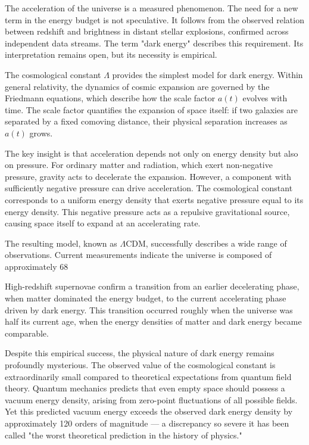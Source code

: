 The acceleration of the universe is a measured phenomenon. The need for a new term in the energy budget is not speculative. It follows from the observed relation between redshift and brightness in distant stellar explosions, confirmed across independent data streams. The term "dark energy" describes this requirement. Its interpretation remains open, but its necessity is empirical.

The cosmological constant $\Lambda$ provides the simplest model for dark energy. Within general relativity, the dynamics of cosmic expansion are governed by the Friedmann equations, which describe how the scale factor $a(t)$ evolves with time. The scale factor quantifies the expansion of space itself: if two galaxies are separated by a fixed comoving distance, their physical separation increases as $a(t)$ grows.

The key insight is that acceleration depends not only on energy density but also on pressure. For ordinary matter and radiation, which exert non-negative pressure, gravity acts to decelerate the expansion. However, a component with sufficiently negative pressure can drive acceleration. The cosmological constant corresponds to a uniform energy density that exerts negative pressure equal to its energy density. This negative pressure acts as a repulsive gravitational source, causing space itself to expand at an accelerating rate.

The resulting model, known as $\Lambda$CDM, successfully describes a wide range of observations. Current measurements indicate the universe is composed of approximately 68%

High-redshift supernovae confirm a transition from an earlier decelerating phase, when matter dominated the energy budget, to the current accelerating phase driven by dark energy. This transition occurred roughly when the universe was half its current age, when the energy densities of matter and dark energy became comparable.

Despite this empirical success, the physical nature of dark energy remains profoundly mysterious. The observed value of the cosmological constant is extraordinarily small compared to theoretical expectations from quantum field theory. Quantum mechanics predicts that even empty space should possess a vacuum energy density, arising from zero-point fluctuations of all possible fields. Yet this predicted vacuum energy exceeds the observed dark energy density by approximately 120 orders of magnitude — a discrepancy so severe it has been called "the worst theoretical prediction in the history of physics."

